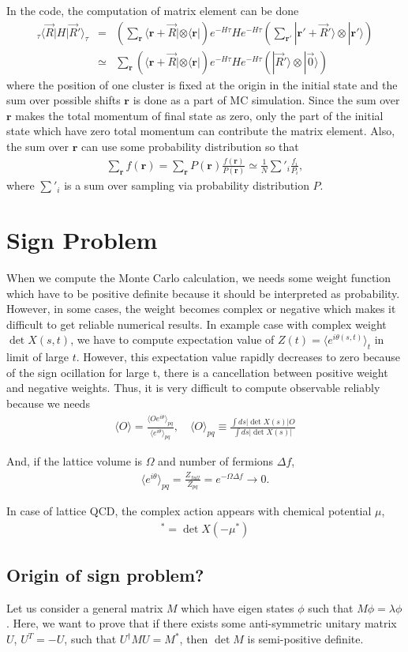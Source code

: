 \documentclass[10pt]{book}
\def\bm{\boldsymbol}
\newcommand{\bea}{\begin{eqnarray}}
\newcommand{\eea}{\end{eqnarray}}
\newcommand{\no}{\nonumber \\}
\def\vr{{\bm r}}
\def\la{\langle}
\def\ra{\rangle}
\begin{document}
In the code, the computation of matrix element can be done
\bea 
{}_\tau\la {\vec R}| H |{\vec R}'\ra_\tau &=& \left(\sum_{\vr} \la \vr+{\vec R}|\otimes\la \vr|\right)
           e^{-H\tau} H e^{-H\tau} \left(\sum_{\vr'} |\vr'+{\vec R}'\ra\otimes |\vr'\ra \right) \no 
        &\simeq&  \sum_{\vr} \left(\la \vr+{\vec R}|\otimes\la \vr|\right)  
              e^{-H\tau} H e^{-H\tau} \left(|{\vec R}'\ra\otimes |{\vec 0}\ra \right)
\eea 
where the position of one cluster is fixed at the origin in the initial state
and the sum over possible shifts $\vr$ is done as a part of MC simulation.
Since the sum over $\vr$ makes the total momentum of final state as zero,
only the part of the initial state which have zero total momentum can contribute the matrix element. 
Also, the sum over $\vr$ can use some probability distribution so that 
\bea 
\sum_{\vr} f(\vr)=\sum_\vr P(\vr) \frac{f(\vr)}{P(\vr)}\simeq \frac{1}{N} \sum'_i \frac{f_i}{P_i},
\eea 
where $\sum'_i$ is a sum over sampling via probability distribution $P$. 


\chapter{Sign Problem}
When we compute the Monte Carlo calculation, we needs some weight function 
which have to be positive definite because it should be interpreted as probability.
However, in some cases, the weight becomes complex or negative
which makes it difficult to get reliable numerical results.
In example case with complex weight $\det X(s,t)$,
we have to compute expectation value of $Z(t)=\la e^{i\theta(s,t)} \ra_{t}$
in limit of large $t$. 
However, this expectation value rapidly decreases to zero
because of the sign ocillation for large t, there is a cancellation 
between positive weight and negative weights. Thus, it is very difficult to compute
observable reliably because we needs
\bea
\la O\ra =\frac{\la O e^{i\theta}\ra_{pq}}{\la e^{i\theta}\ra_{pq}},\quad
\la O\ra_{pq}\equiv \frac{ \int d{s} |\det X(s)| O}{ \int d{s} |\det X(s)|}
\eea 

And, if the lattice volume is $\Omega$ and number of fermions $\Delta f$, 
\bea
\la e^{i\theta}\ra_{pq}=\frac{Z_{full}}{Z_{pq}}=e^{-\Omega\Delta f}\to 0.
\eea 

In case of lattice QCD, the complex action appears with chemical potential $\mu$, 
\bea
[\det X(\mu)]^*=\det X(-\mu^*) 
\eea

\section{Origin of sign problem?}
Let us consider a general matrix $M$ which have eigen states $\phi$ such that 
$M\phi=\lambda\phi$. Here, we want to prove that if there exists some 
anti-symmetric unitary matrix $U$, $U^T=-U$, such that $U^\dagger M U = M^*$,
then $\det M$ is semi-positive definite.
\end{document}
